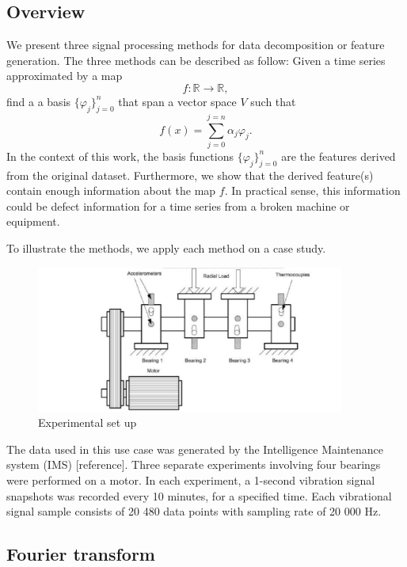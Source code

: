 \documentclass[11pt, oneside]{article}   	%
\begin{document}
\subsection{Overview}
We present three signal processing methods for data decomposition or feature generation. The three methods can be described as follow: Given a time series approximated by a map
\begin{equation}
f: \mathbb{R} \rightarrow \mathbb{R},
\end{equation}
find a  a basis $\{ \varphi_{j} \}_{j=0}^{n}$ that span a vector space $V$ such that 
\begin{equation}
f(x) = \sum_{j=0}^{j=n}\alpha_{j}\varphi_{j}.
\end{equation}
In the context of this work, the basis functions $\{ \varphi_{j} \}_{j=0}^{n}$ are the features derived from the original dataset. Furthermore, we show that the derived feature(s) contain enough information about the map $f$. In practical sense, this information could be defect information for a time series from a broken machine or equipment.
\begin{flushleft}
To illustrate the methods, we apply each method on a case study. 
\begin{figure}[H] %
   \centering
   \includegraphics[width=4in]{experiment} 
   \caption{Experimental set up}
   \label{fig:exp}
\end{figure}
The data used in this use case was generated by the Intelligence Maintenance system (IMS) [reference].
Three separate experiments involving four bearings were performed on a motor. In each experiment, a 1-second vibration signal snapshots was recorded every 10 minutes, for a specified time. Each vibrational signal sample consists of 20 480 data points with sampling rate of 20 000 Hz.
\end{flushleft}
\subsection{Fourier transform}
\end{document}
